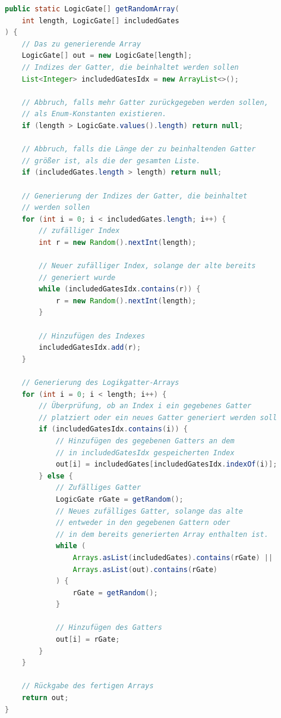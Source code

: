 \begin{lstlisting}[caption=getRandomArray-Methode, label=lst:mggetRandomArray, captionpos=t, language=Java]
public static LogicGate[] getRandomArray(
    int length, LogicGate[] includedGates
) {
    // Das zu generierende Array
    LogicGate[] out = new LogicGate[length];
    // Indizes der Gatter, die beinhaltet werden sollen
    List<Integer> includedGatesIdx = new ArrayList<>();

    // Abbruch, falls mehr Gatter zurückgegeben werden sollen,
    // als Enum-Konstanten existieren.
    if (length > LogicGate.values().length) return null;

    // Abbruch, falls die Länge der zu beinhaltenden Gatter
    // größer ist, als die der gesamten Liste.
    if (includedGates.length > length) return null;

    // Generierung der Indizes der Gatter, die beinhaltet
    // werden sollen
    for (int i = 0; i < includedGates.length; i++) {
        // zufälliger Index
        int r = new Random().nextInt(length);

        // Neuer zufälliger Index, solange der alte bereits
        // generiert wurde
        while (includedGatesIdx.contains(r)) {
            r = new Random().nextInt(length);
        }

        // Hinzufügen des Indexes
        includedGatesIdx.add(r);
    }

    // Generierung des Logikgatter-Arrays
    for (int i = 0; i < length; i++) {
        // Überprüfung, ob an Index i ein gegebenes Gatter
        // platziert oder ein neues Gatter generiert werden soll
        if (includedGatesIdx.contains(i)) {
            // Hinzufügen des gegebenen Gatters an dem
            // in includedGatesIdx gespeicherten Index
            out[i] = includedGates[includedGatesIdx.indexOf(i)];
        } else {
            // Zufälliges Gatter
            LogicGate rGate = getRandom();
            // Neues zufälliges Gatter, solange das alte
            // entweder in den gegebenen Gattern oder
            // in dem bereits generierten Array enthalten ist.
            while (
                Arrays.asList(includedGates).contains(rGate) ||
                Arrays.asList(out).contains(rGate)
            ) {
                rGate = getRandom();
            }

            // Hinzufügen des Gatters
            out[i] = rGate;
        }
    }

    // Rückgabe des fertigen Arrays
    return out;
}
\end{lstlisting}

